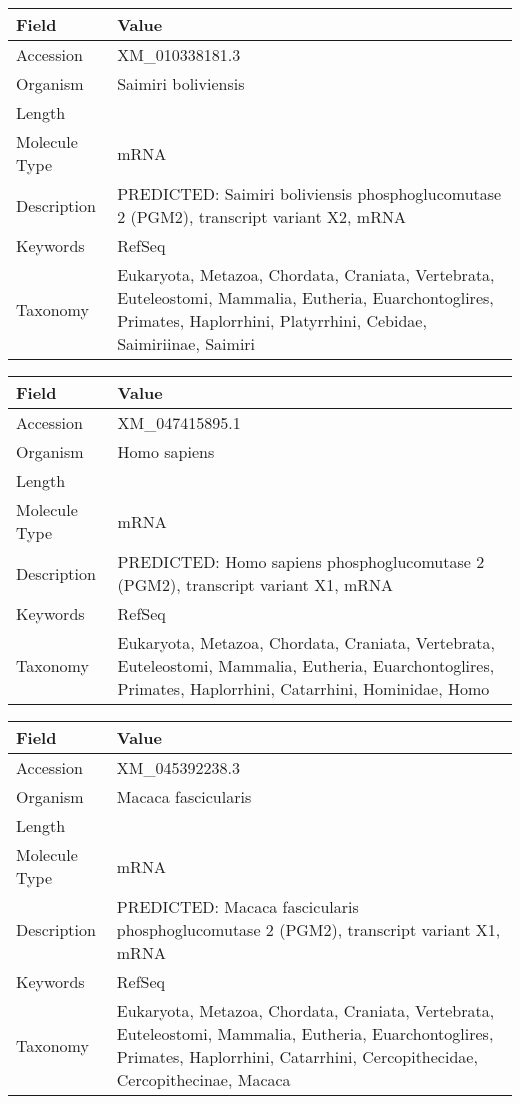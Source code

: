 \documentclass[10pt]{article}
\begin{document}
\vspace{1em}
{\footnotesize
\begin{longtable}{>{\raggedright\arraybackslash}p{4.5cm} >{\raggedright\arraybackslash}p{11.5cm}}
\textbf{Field} & \textbf{Value} \\
\hline
Accession & XM\_010338181.3 \\
Organism & Saimiri boliviensis \\
Length & 2692 \\
Molecule Type & mRNA \\
Description & PREDICTED: Saimiri boliviensis phosphoglucomutase 2 (PGM2), transcript variant X2, mRNA \\
Keywords & RefSeq \\
Taxonomy & Eukaryota, Metazoa, Chordata, Craniata, Vertebrata, Euteleostomi, Mammalia, Eutheria, Euarchontoglires, Primates, Haplorrhini, Platyrrhini, Cebidae, Saimiriinae, Saimiri \\
\end{longtable}
}

\vspace{1em}
{\footnotesize
\begin{longtable}{>{\raggedright\arraybackslash}p{4.5cm} >{\raggedright\arraybackslash}p{11.5cm}}
\textbf{Field} & \textbf{Value} \\
\hline
Accession & XM\_047415895.1 \\
Organism & Homo sapiens \\
Length & 2834 \\
Molecule Type & mRNA \\
Description & PREDICTED: Homo sapiens phosphoglucomutase 2 (PGM2), transcript variant X1, mRNA \\
Keywords & RefSeq \\
Taxonomy & Eukaryota, Metazoa, Chordata, Craniata, Vertebrata, Euteleostomi, Mammalia, Eutheria, Euarchontoglires, Primates, Haplorrhini, Catarrhini, Hominidae, Homo \\
\end{longtable}
}

\vspace{1em}
{\footnotesize
\begin{longtable}{>{\raggedright\arraybackslash}p{4.5cm} >{\raggedright\arraybackslash}p{11.5cm}}
\textbf{Field} & \textbf{Value} \\
\hline
Accession & XM\_045392238.3 \\
Organism & Macaca fascicularis \\
Length & 2381 \\
Molecule Type & mRNA \\
Description & PREDICTED: Macaca fascicularis phosphoglucomutase 2 (PGM2), transcript variant X1, mRNA \\
Keywords & RefSeq \\
Taxonomy & Eukaryota, Metazoa, Chordata, Craniata, Vertebrata, Euteleostomi, Mammalia, Eutheria, Euarchontoglires, Primates, Haplorrhini, Catarrhini, Cercopithecidae, Cercopithecinae, Macaca \\
\end{longtable}
}
\end{document}
